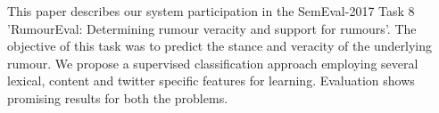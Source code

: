 This paper describes our system participation in the SemEval-2017 Task 8 'RumourEval: Determining rumour veracity and support for rumours'. The objective of this task was to predict the stance and veracity of the underlying rumour. We propose a supervised classification approach employing several lexical, content and twitter specific features for learning. Evaluation shows promising results for both the problems.
